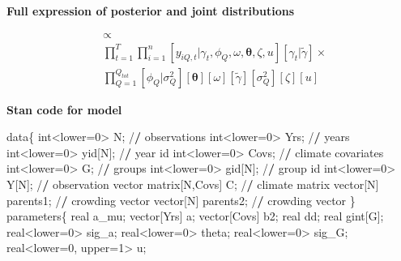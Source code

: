 \documentclass[12pt,]{article}
\newenvironment{Shaded}{\begin{snugshade}}{\end{snugshade}}
\newcommand{\DecValTok}[1]{\textcolor[rgb]{0.00,0.00,0.81}{{#1}}}
\newcommand{\StringTok}[1]{\textcolor[rgb]{0.31,0.60,0.02}{{#1}}}
\newcommand{\ErrorTok}[1]{\textbf{{#1}}}
\newcommand{\NormalTok}[1]{{#1}}
\begin{document}
\textbf{Full expression of posterior and joint distributions}

\begin{align}
[\boldsymbol{\gamma}, \tilde{\gamma}, \boldsymbol{\phi}, \omega, \boldsymbol{\theta}, \sigma_Q^2, \zeta, u] &\propto \\
&\prod_{t=1}^T \prod_{i=1}^n [y_{iQ,t} | \gamma_{t}, \phi_{Q}, \omega, \boldsymbol{\theta}, \zeta, u] [\gamma_{t} | \tilde{\gamma}] \times \\
&\prod_{Q=1}^{Q_{tot}} [\phi_{Q} | \sigma_Q^2] [\boldsymbol{\theta}] [\omega] [\tilde{\gamma}] [\sigma_Q^2] [\zeta] [u]
\end{align}

\textbf{Stan code for model}

\begin{Shaded}
\begin{Highlighting}[]
\NormalTok{data\{}
  \NormalTok{int<lower=}\DecValTok{0}\NormalTok{>}\StringTok{ }\NormalTok{N; /}\ErrorTok{/}\StringTok{ }\NormalTok{observations}
  \NormalTok{int<lower=}\DecValTok{0}\NormalTok{>}\StringTok{ }\NormalTok{Yrs; /}\ErrorTok{/}\StringTok{ }\NormalTok{years}
  \NormalTok{int<lower=}\DecValTok{0}\NormalTok{>}\StringTok{ }\NormalTok{yid[N]; /}\ErrorTok{/}\StringTok{ }\NormalTok{year id}
  \NormalTok{int<lower=}\DecValTok{0}\NormalTok{>}\StringTok{ }\NormalTok{Covs; /}\ErrorTok{/}\StringTok{ }\NormalTok{climate covariates}
  \NormalTok{int<lower=}\DecValTok{0}\NormalTok{>}\StringTok{ }\NormalTok{G; /}\ErrorTok{/}\StringTok{ }\NormalTok{groups}
  \NormalTok{int<lower=}\DecValTok{0}\NormalTok{>}\StringTok{ }\NormalTok{gid[N]; /}\ErrorTok{/}\StringTok{ }\NormalTok{group id}
  \NormalTok{int<lower=}\DecValTok{0}\NormalTok{>}\StringTok{ }\NormalTok{Y[N]; /}\ErrorTok{/}\StringTok{ }\NormalTok{observation vector}
  \NormalTok{matrix[N,Covs] C; /}\ErrorTok{/}\StringTok{ }\NormalTok{climate matrix}
  \NormalTok{vector[N] parents1; /}\ErrorTok{/}\StringTok{ }\NormalTok{crowding vector}
  \NormalTok{vector[N] parents2; /}\ErrorTok{/}\StringTok{ }\NormalTok{crowding vector}
\NormalTok{\}}
\NormalTok{parameters\{}
  \NormalTok{real a_mu;}
  \NormalTok{vector[Yrs] a;}
  \NormalTok{vector[Covs] b2;}
  \NormalTok{real dd;}
  \NormalTok{real gint[G];}
  \NormalTok{real<lower=}\DecValTok{0}\NormalTok{>}\StringTok{ }\NormalTok{sig_a;}
  \NormalTok{real<lower=}\DecValTok{0}\NormalTok{>}\StringTok{ }\NormalTok{theta;}
  \NormalTok{real<lower=}\DecValTok{0}\NormalTok{>}\StringTok{ }\NormalTok{sig_G;}
  \NormalTok{real<lower=}\DecValTok{0}\NormalTok{, upper=}\DecValTok{1}\NormalTok{>}\StringTok{ }\NormalTok{u;}

\end{Highlighting}
\end{Shaded}
\end{document}
